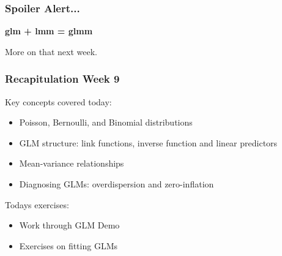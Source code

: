 \documentclass{beamer}
\begin{document}
\begin{frame}
    \frametitle{Spoiler Alert...}
    \centering
    \huge\textbf{glm + lmm = glmm}
    \vspace{0.2cm}
    
    \normalsize More on that next week.
\end{frame}
\begin{frame}[fragile]
    \frametitle{Recapitulation Week 9}
    Key concepts covered today:
    \begin{itemize}
        \item Poisson, Bernoulli, and Binomial distributions
        \item GLM structure: link functions, inverse function and linear predictors
        \item Mean-variance relationships
        \item Diagnosing GLMs: overdispersion and zero-inflation
    \end{itemize}
    Todays exercises:
    \begin{itemize}
        \item Work through GLM Demo
        \item Exercises on fitting GLMs
    \end{itemize}
\end{frame}
\end{document}
